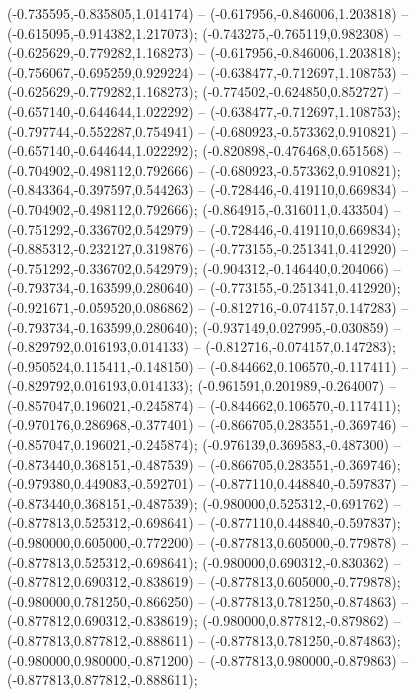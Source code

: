  (-0.735595,-0.835805,1.014174) -- (-0.617956,-0.846006,1.203818) -- (-0.615095,-0.914382,1.217073);
 (-0.743275,-0.765119,0.982308) -- (-0.625629,-0.779282,1.168273) -- (-0.617956,-0.846006,1.203818);
 (-0.756067,-0.695259,0.929224) -- (-0.638477,-0.712697,1.108753) -- (-0.625629,-0.779282,1.168273);
 (-0.774502,-0.624850,0.852727) -- (-0.657140,-0.644644,1.022292) -- (-0.638477,-0.712697,1.108753);
 (-0.797744,-0.552287,0.754941) -- (-0.680923,-0.573362,0.910821) -- (-0.657140,-0.644644,1.022292);
 (-0.820898,-0.476468,0.651568) -- (-0.704902,-0.498112,0.792666) -- (-0.680923,-0.573362,0.910821);
 (-0.843364,-0.397597,0.544263) -- (-0.728446,-0.419110,0.669834) -- (-0.704902,-0.498112,0.792666);
 (-0.864915,-0.316011,0.433504) -- (-0.751292,-0.336702,0.542979) -- (-0.728446,-0.419110,0.669834);
 (-0.885312,-0.232127,0.319876) -- (-0.773155,-0.251341,0.412920) -- (-0.751292,-0.336702,0.542979);
 (-0.904312,-0.146440,0.204066) -- (-0.793734,-0.163599,0.280640) -- (-0.773155,-0.251341,0.412920);
 (-0.921671,-0.059520,0.086862) -- (-0.812716,-0.074157,0.147283) -- (-0.793734,-0.163599,0.280640);
 (-0.937149,0.027995,-0.030859) -- (-0.829792,0.016193,0.014133) -- (-0.812716,-0.074157,0.147283);
 (-0.950524,0.115411,-0.148150) -- (-0.844662,0.106570,-0.117411) -- (-0.829792,0.016193,0.014133);
 (-0.961591,0.201989,-0.264007) -- (-0.857047,0.196021,-0.245874) -- (-0.844662,0.106570,-0.117411);
 (-0.970176,0.286968,-0.377401) -- (-0.866705,0.283551,-0.369746) -- (-0.857047,0.196021,-0.245874);
 (-0.976139,0.369583,-0.487300) -- (-0.873440,0.368151,-0.487539) -- (-0.866705,0.283551,-0.369746);
 (-0.979380,0.449083,-0.592701) -- (-0.877110,0.448840,-0.597837) -- (-0.873440,0.368151,-0.487539);
 (-0.980000,0.525312,-0.691762) -- (-0.877813,0.525312,-0.698641) -- (-0.877110,0.448840,-0.597837);
 (-0.980000,0.605000,-0.772200) -- (-0.877813,0.605000,-0.779878) -- (-0.877813,0.525312,-0.698641);
 (-0.980000,0.690312,-0.830362) -- (-0.877812,0.690312,-0.838619) -- (-0.877813,0.605000,-0.779878);
 (-0.980000,0.781250,-0.866250) -- (-0.877813,0.781250,-0.874863) -- (-0.877812,0.690312,-0.838619);
 (-0.980000,0.877812,-0.879862) -- (-0.877813,0.877812,-0.888611) -- (-0.877813,0.781250,-0.874863);
 (-0.980000,0.980000,-0.871200) -- (-0.877813,0.980000,-0.879863) -- (-0.877813,0.877812,-0.888611);
